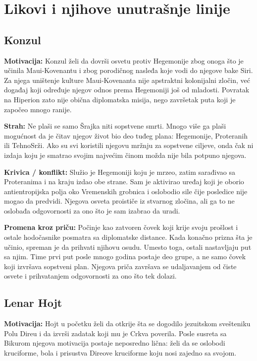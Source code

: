 \section*{Likovi i njihove unutrašnje linije}

\subsection*{Konzul}

\textbf{Motivacija:} Konzul želi da dovrši osvetu protiv Hegemonije zbog onoga što je učinila Maui-Kovenantu i zbog porodičnog nasleđa koje vodi do njegove bake Siri. Za njega uništenje kulture Maui-Kovenanta nije apstraktni kolonijalni zločin, već događaj koji određuje njegov odnos prema Hegemoniji još od mladosti. Povratak na Hiperion zato nije obična diplomatska misija, nego završetak puta koji je započeo mnogo ranije.

\textbf{Strah:} Ne plaši se samo Šrajka niti sopstvene smrti. Mnogo više ga plaši mogućnost da je čitav njegov život bio deo tuđeg plana: Hegemonije, Proteranih ili TehnoSrži. Ako su svi koristili njegovu mržnju za sopstvene ciljeve, onda čak ni izdaja koju je smatrao svojim najvećim činom možda nije bila potpuno njegova.

\textbf{Krivica / konflikt:} Služio je Hegemoniji koju je mrzeo, zatim sarađivao sa Proteranima i na kraju izdao obe strane. Sam je aktivirao uređaj koji je oborio antientropijska polja oko Vremenskih grobnica i oslobodio sile čije posledice nije mogao da predvidi. Njegova osveta proističe iz stvarnog zločina, ali ga to ne oslobađa odgovornosti za ono što je sam izabrao da uradi.

\textbf{Promena kroz priču:} Počinje kao zatvoren čovek koji krije svoju prošlost i ostale hodočasnike posmatra sa diplomatske distance. Kada konačno prizna šta je učinio, spreman je da prihvati njihovu osudu. Umesto toga, ostali nastavljaju put sa njim. Time prvi put posle mnogo godina postaje deo grupe, a ne samo čovek koji izvršava sopstveni plan. Njegova priča završava se udaljavanjem od čiste osvete i prihvatanjem odgovornosti za ono što tek dolazi.


\subsection*{Lenar Hojt}

\textbf{Motivacija:} Hojt u početku želi da otkrije šta se dogodilo jezuitskom svešteniku Polu Direu i da izvrši zadatak koji mu je Crkva poverila. Posle susreta sa Bikurom njegova motivacija postaje neposredno lična: želi da se oslobodi kruciforme, bola i prisustva Direove kruciforme koju nosi zajedno sa svojom.

